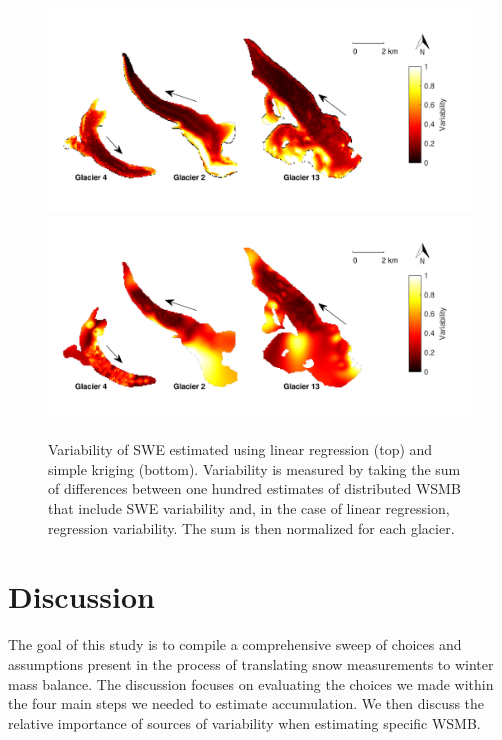 \documentclass[twocolumn,letterpaper]{igs}
\begin{document}
\begin{figure}
	\centering
	\includegraphics[width =\textwidth]{SpatialVar_LR.pdf}\\
	\includegraphics[width =\textwidth]{SpatialVar_SK.pdf}\\
	\caption{Variability of SWE estimated using linear regression (top) and simple kriging (bottom).	Variability is measured by taking the sum of differences between one hundred estimates of distributed WSMB that include SWE variability and, in the case of linear regression, regression variability. The sum is then normalized for each glacier.}
	\label{fig:WSMBspatialvar}
\end{figure}




\section{Discussion}

The goal of this study is to compile a comprehensive sweep of choices and assumptions present in the process of translating snow measurements to winter mass balance. The discussion focuses on evaluating the choices we made within the four main steps we needed to estimate accumulation. We then discuss the relative importance of sources of variability when estimating specific WSMB.
\end{document}
